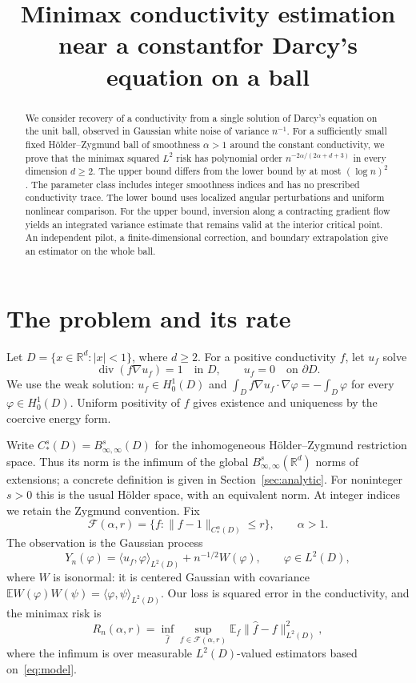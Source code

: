\documentclass[11pt]{article}
\title{Minimax conductivity estimation near a constant\nl for Darcy's equation on a ball}
\author{}
\date{}
\theoremstyle{remark}
\newcommand{\R}{\mathbb R}
\newcommand{\E}{\mathbb E}
\newcommand{\cF}{\mathcal F}
\newcommand{\diver}{\operatorname{div}}
\newcommand{\norm}[1]{\lVert #1\rVert}
\newcommand{\abs}[1]{\lvert #1\rvert}
\newcommand{\ip}[2]{\langle #1,#2\rangle}
\begin{document}
\maketitle

\begin{abstract}
We consider recovery of a conductivity from a single solution of Darcy's equation on the unit ball, observed in Gaussian white noise of variance $n^{-1}$. For a sufficiently small fixed H\"older--Zygmund ball of smoothness $\alpha>1$ around the constant conductivity, we prove that the minimax squared $L^2$ risk has polynomial order $n^{-2\alpha/(2\alpha+d+3)}$ in every dimension $d\ge2$. The upper bound differs from the lower bound by at most $(\log n)^2$. The parameter class includes integer smoothness indices and has no prescribed conductivity trace. The lower bound uses localized angular perturbations and uniform nonlinear comparison. For the upper bound, inversion along a contracting gradient flow yields an integrated variance estimate that remains valid at the interior critical point. An independent pilot, a finite-dimensional correction, and boundary extrapolation give an estimator on the whole ball.
\end{abstract}

\section{The problem and its rate}
Let $D=\{x\in\R^d:\abs{x}<1\}$, where $d\ge2$. For a positive conductivity $f$, let $u_f$ solve
\begin{equation}\label{eq:pde}
 \diver(f\nabla u_f)=1\quad\text{in }D,
 \qquad u_f=0\quad\text{on }\partial D.
\end{equation}
We use the weak solution: $u_f\in H_0^1(D)$ and
$\int_D f\nabla u_f\cdot\nabla\varphi=-\int_D\varphi$ for every $\varphi\in H_0^1(D)$.
Uniform positivity of $f$ gives existence and uniqueness by the coercive energy form.

Write $C_*^s(D)=B^s_{\infty,\infty}(D)$ for the inhomogeneous H\"older--Zygmund restriction space. Thus its norm is the infimum of the global $B^s_{\infty,\infty}(\R^d)$ norms of extensions; a concrete definition is given in Section~\ref{sec:analytic}. For noninteger $s>0$ this is the usual H\"older space, with an equivalent norm. At integer indices we retain the Zygmund convention. Fix
\begin{equation}\label{eq:class}
 \cF(\alpha,r)=\{f:\norm{f-1}_{C_*^\alpha(D)}\le r\},
 \qquad \alpha>1.
\end{equation}
The observation is the Gaussian process
\begin{equation}\label{eq:model}
 Y_n(\varphi)=\ip{u_f}{\varphi}_{L^2(D)}+n^{-1/2}W(\varphi),
 \qquad \varphi\in L^2(D),
\end{equation}
where $W$ is isonormal: it is centered Gaussian with covariance
$\E W(\varphi)W(\psi)=\ip{\varphi}{\psi}_{L^2(D)}$.
Our loss is squared error in the conductivity, and the minimax risk is
\[
 R_n(\alpha,r)=\inf_{\widehat f}\sup_{f\in\cF(\alpha,r)}
 \E_f\norm{\widehat f-f}_{L^2(D)}^2,
\]
where the infimum is over measurable $L^2(D)$-valued estimators based on~\eqref{eq:model}.
\end{document}
